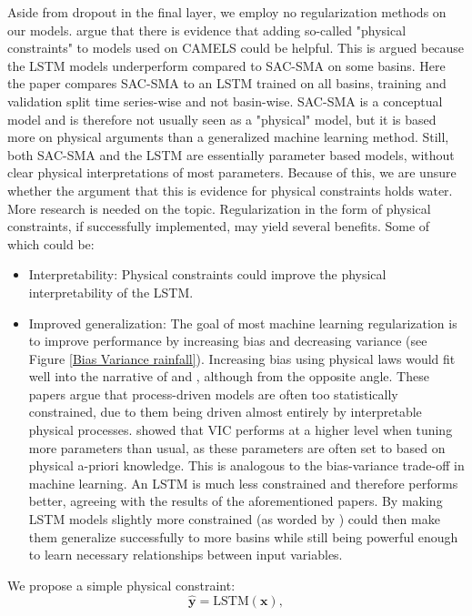Aside from dropout in the final layer, we employ no regularization methods on 
our models. \citet{lstm_third_paper} 
argue that there is evidence that adding so-called "physical constraints" to 
models used on CAMELS could be helpful. This is argued because the LSTM models 
underperform compared to SAC-SMA on some basins. Here the paper compares SAC-SMA 
to an LSTM trained on all basins, training and validation split time series-wise 
and not basin-wise. SAC-SMA is a conceptual model and is therefore not usually seen 
as a "physical" model, but it is based more on physical arguments than a 
generalized machine learning method. Still, both SAC-SMA and the LSTM are essentially 
parameter based models, without clear physical interpretations of most parameters. 
Because of this, we are unsure whether the argument that this is evidence for physical 
constraints holds water. More research is needed on the topic. Regularization in 
the form of physical constraints, if successfully implemented, may yield several 
benefits. Some of which could be:
\begin{itemize}
\item Interpretability: Physical constraints could improve the physical interpretability 
of the LSTM.
\item Improved generalization: The goal of most machine learning regularization is 
to improve performance by increasing bias and decreasing variance (see Figure 
\ref{Bias Variance rainfall}). Increasing bias using physical laws would fit well 
into the narrative of \citet{BiasVarianceVIC} and \citet{VICbench}, although from 
the opposite angle. These papers argue that process-driven models are often too 
statistically constrained, due to them being driven almost entirely by interpretable 
physical processes. \citet{VICbench} showed that VIC performs at a higher level 
when tuning more parameters than usual, as these parameters are often set to based 
on physical a-priori knowledge. This is analogous to the bias-variance trade-off 
in machine learning. An LSTM is much less constrained and therefore performs better, 
agreeing with the results of the aforementioned papers. By making LSTM models 
slightly more constrained (as worded by \citet{BiasVarianceVIC}) could then make 
them generalize successfully to more basins while still being powerful enough to 
learn necessary relationships between input variables.
\end{itemize}
We propose a simple physical constraint:
\begin{equation}
\bm{\hat{y}} = \text{LSTM}(\bm{x}),
\end{equation}
